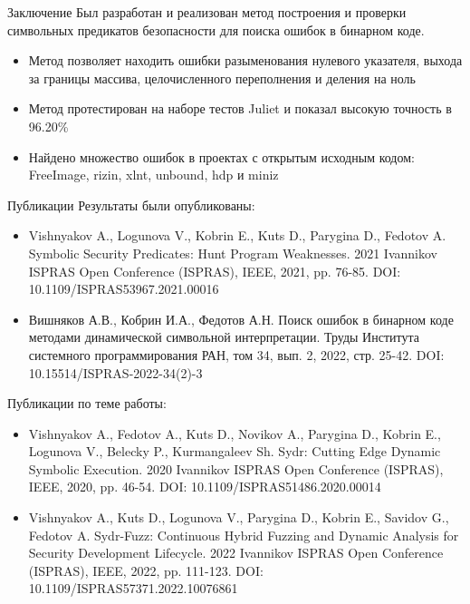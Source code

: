 \documentclass[10pt]{beamer}
\begin{document}
\begin{frame}{Заключение}
Был разработан и реализован метод построения и проверки символьных
предикатов безопасности для поиска ошибок в бинарном коде.
\begin{itemize}
    \item Метод позволяет находить ошибки разыменования нулевого указателя,
        выхода за границы массива, целочисленного переполнения и деления на ноль
    \item Метод протестирован на наборе тестов Juliet и показал высокую
        точность в 96.20\%
    \item Найдено множество ошибок в проектах с открытым исходным кодом:
        FreeImage, rizin, xlnt, unbound, hdp и miniz
\end{itemize}
\end{frame}

\begin{frame}{Публикации}
\footnotesize
Результаты были опубликованы:
\begin{itemize}
    \item Vishnyakov A., Logunova V., Kobrin E., Kuts D., Parygina D., Fedotov A. Symbolic Security Predicates: Hunt Program Weaknesses. 2021 Ivannikov ISPRAS Open Conference (ISPRAS), IEEE, 2021, pp. 76-85. DOI: 10.1109/ISPRAS53967.2021.00016
    \item Вишняков А.В., Кобрин И.А., Федотов А.Н. Поиск ошибок в бинарном коде методами динамической символьной интерпретации. Труды Института системного программирования РАН, том 34, вып. 2, 2022, стр. 25-42. DOI: 10.15514/ISPRAS-2022-34(2)-3
\end{itemize}

Публикации по теме работы:
\begin{itemize}
    \item Vishnyakov A., Fedotov A., Kuts D., Novikov A., Parygina D., Kobrin E., Logunova V., Belecky P., Kurmangaleev Sh. Sydr: Cutting Edge Dynamic Symbolic Execution. 2020 Ivannikov ISPRAS Open Conference (ISPRAS), IEEE, 2020, pp. 46-54. DOI: 10.1109/ISPRAS51486.2020.00014
    \item Vishnyakov A., Kuts D., Logunova V., Parygina D., Kobrin E., Savidov G., Fedotov A. Sydr-Fuzz: Continuous Hybrid Fuzzing and Dynamic Analysis for Security Development Lifecycle. 2022 Ivannikov ISPRAS Open Conference (ISPRAS), IEEE, 2022, pp. 111-123. DOI: 10.1109/ISPRAS57371.2022.10076861
\end{itemize}
\end{frame}
\end{document}
